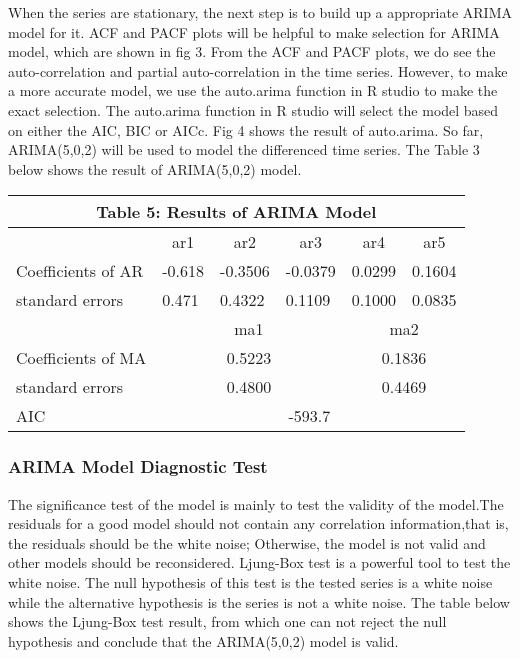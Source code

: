 When the series are stationary, the next step is to build up a appropriate ARIMA model for it. ACF and PACF plots will be helpful to make selection for ARIMA model, which are shown in fig 3. From the ACF and PACF plots, we do see the auto-correlation and partial auto-correlation in the time series. However, to make a more accurate model, we use the auto.arima function in R studio to make the exact selection. The auto.arima function in R studio will select the model  based on either the AIC, BIC or AICc. Fig 4 shows the result of auto.arima. So far, ARIMA(5,0,2) will be used to model the differenced time series. The Table 3 below shows the result of ARIMA(5,0,2) model. 
\begin{table}[]
\centering
\begin{tabular}{|l|c|c|c|c|c|}
\hline
\multicolumn{6}{|c|}{Table 5: Results of ARIMA Model} \\ \hline
 & ar1 & ar2 & ar3 & ar4 & ar5 \\ \hline
Coefficients of AR & -0.618 & -0.3506 & -0.0379 & 0.0299 & 0.1604 \\ \hline
standard errors & \multicolumn{1}{l|}{0.471} & \multicolumn{1}{l|}{0.4322} & \multicolumn{1}{l|}{0.1109} & \multicolumn{1}{l|}{0.1000} & \multicolumn{1}{l|}{0.0835} \\ \hline
 & \multicolumn{3}{c|}{ma1} & \multicolumn{2}{c|}{ma2} \\ \hline
Coefficients of MA & \multicolumn{3}{c|}{0.5223} & \multicolumn{2}{c|}{0.1836} \\ \hline
standard errors & \multicolumn{3}{c|}{0.4800} & \multicolumn{2}{c|}{0.4469} \\ \hline
AIC & \multicolumn{5}{c|}{-593.7} \\ \hline
\end{tabular}
\end{table}
\subsubsection{ARIMA Model Diagnostic Test}
The significance test of the model is mainly to test the validity of the model.The residuals for a good model should not contain any correlation information,that is, the residuals should be the white noise; Otherwise, the model is not valid and other models should be reconsidered. Ljung-Box test is a powerful tool to test the white noise. The null hypothesis of this test is the tested series is a white noise while the alternative hypothesis is the series is not a white noise. The table below shows the Ljung-Box test result, from which one can not reject the null hypothesis and conclude that the ARIMA(5,0,2) model is valid.


